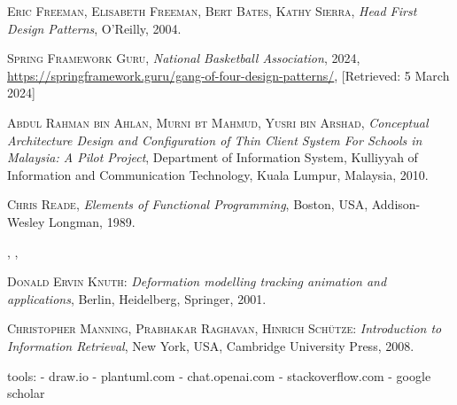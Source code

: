 \documentclass{thesis-ekf}
\theoremstyle{definition}
\theoremstyle{remark}
\begin{document}
\begin{thebibliography}{2}
\textsc{Eric Freeman, Elisabeth Freeman, Bert Bates, Kathy Sierra},
\emph{Head First Design Patterns},
O'Reilly, 2004.

\textsc{Spring Framework Guru},
\emph{National Basketball Association}, 2024, 
\url{https://springframework.guru/gang-of-four-design-patterns/}, [Retrieved: 5 March 2024]

\textsc{Abdul Rahman bin Ahlan, Murni bt Mahmud, Yusri bin Arshad},
\emph{Conceptual Architecture Design and Configuration of Thin Client System For Schools in Malaysia: A Pilot Project}, 
Department of Information System, Kulliyyah of Information and Communication Technology,
Kuala Lumpur, Malaysia, 2010.

\textsc{Chris Reade},
\emph{Elements of Functional Programming}, 
Boston, USA, Addison-Wesley Longman, 1989.

\bibitem{}
\textsc{},
\emph{}, 

\textsc{Donald Ervin Knuth}: 
\emph{Deformation modelling tracking animation and applications}, Berlin, Heidelberg, Springer, 2001.

\textsc{Christopher Manning, Prabhakar Raghavan, Hinrich Sch\"{u}tze}: 
\emph{Introduction to Information Retrieval}, New York, USA, Cambridge University Press, 2008.
\end{thebibliography}

tools:
- draw.io
- plantuml.com
- chat.openai.com
- stackoverflow.com
- google scholar
\end{document}
